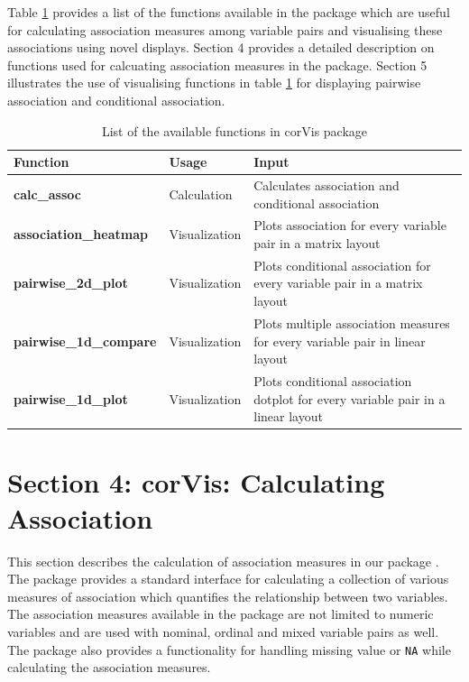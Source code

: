 Table \ref{tab:function-corVis} provides a list of the functions
available in the package which are useful for calculating association
measures among variable pairs and visualising these associations using
novel displays. Section 4 provides a detailed description on functions
used for calcuating association measures in the package. Section 5
illustrates the use of visualising functions in table
\ref{tab:function-corVis} for displaying pairwise association and
conditional association.

\begin{Schunk}
\begin{table}

\caption{\label{tab:function-corVis}List of the available functions in corVis package}
\centering
\begin{tabular}[t]{>{}lll}
\toprule
Function & Usage & Input\\
\midrule
\textbf{calc\_assoc} & Calculation & Calculates association and conditional association\\
\textbf{association\_heatmap} & Visualization & Plots association for every variable pair in a matrix layout\\
\textbf{pairwise\_2d\_plot} & Visualization & Plots conditional association for every variable pair in a matrix layout\\
\textbf{pairwise\_1d\_compare} & Visualization & Plots multiple association measures for every variable pair in linear layout\\
\textbf{pairwise\_1d\_plot} & Visualization & Plots conditional association dotplot for every variable pair in a linear layout\\
\bottomrule
\end{tabular}
\end{table}

\end{Schunk}

\hypertarget{section-4-corvis-calculating-association}{%
\section{Section 4: corVis: Calculating
Association}\label{section-4-corvis-calculating-association}}

This section describes the calculation of association measures in our
package . The package provides a standard interface for
calculating a collection of various measures of association which
quantifies the relationship between two variables. The association
measures available in the package are not limited to numeric variables
and are used with nominal, ordinal and mixed variable pairs as well. The
package also provides a functionality for handling missing value or
\texttt{NA} while calculating the association measures.

